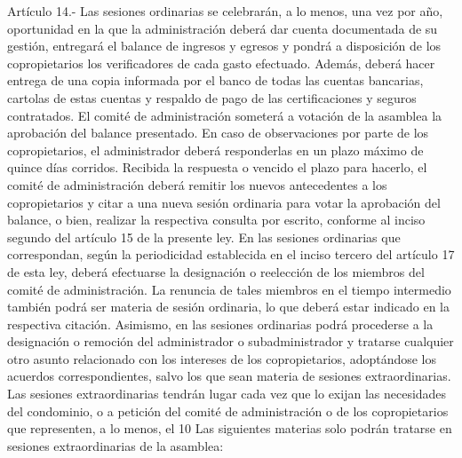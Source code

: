     Artículo 14.- Las sesiones ordinarias se celebrarán, a lo menos, una vez por año, oportunidad en la que la administración deberá dar cuenta documentada de su gestión, entregará el balance de ingresos y egresos y pondrá a disposición de los copropietarios los verificadores de cada gasto efectuado. Además, deberá hacer entrega de una copia informada por el banco de todas las cuentas bancarias, cartolas de estas cuentas y respaldo de pago de las certificaciones y seguros contratados.
    El comité de administración someterá a votación de la asamblea la aprobación del balance presentado. En caso de observaciones por parte de los copropietarios, el administrador deberá responderlas en un plazo máximo de quince días corridos. Recibida la respuesta o vencido el plazo para hacerlo, el comité de administración deberá remitir los nuevos antecedentes a los copropietarios y citar a una nueva sesión ordinaria para votar la aprobación del balance, o bien, realizar la respectiva consulta por escrito, conforme al inciso segundo del artículo 15 de la presente ley.
    En las sesiones ordinarias que correspondan, según la periodicidad establecida en el inciso tercero del artículo 17 de esta ley, deberá efectuarse la designación o reelección de los miembros del comité de administración. La renuncia de tales miembros en el tiempo intermedio también podrá ser materia de sesión ordinaria, lo que deberá estar indicado en la respectiva citación.
    Asimismo, en las sesiones ordinarias podrá procederse a la designación o remoción del administrador o subadministrador y tratarse cualquier otro asunto relacionado con los intereses de los copropietarios, adoptándose los acuerdos correspondientes, salvo los que sean materia de sesiones extraordinarias.
    Las sesiones extraordinarias tendrán lugar cada vez que lo exijan las necesidades del condominio, o a petición del comité de administración o de los copropietarios que representen, a lo menos, el 10%
    Las siguientes materias solo podrán tratarse en sesiones extraordinarias de la asamblea:
     
